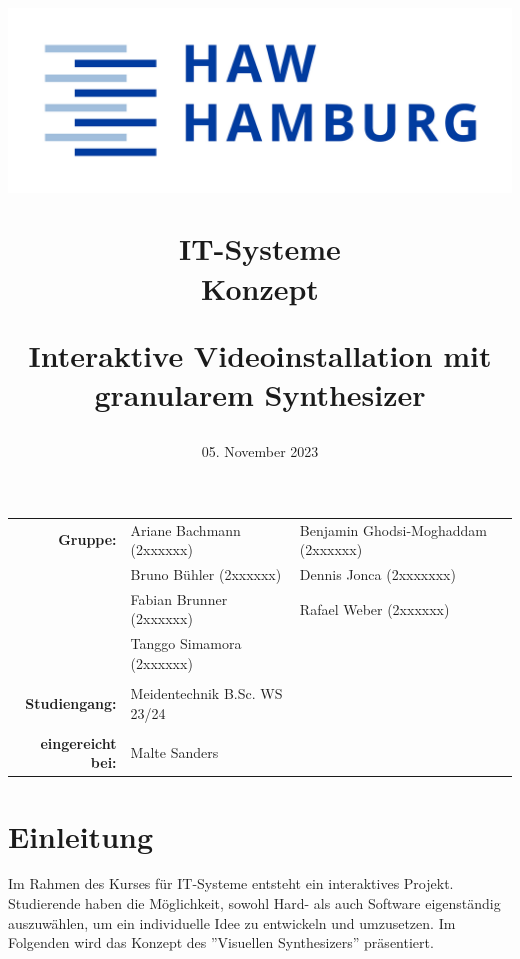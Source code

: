 \documentclass[12pt]{scrartcl}%
\title{
\begin{flushright}
 \includegraphics[scale=0.5]{HAW_Marke_RGB_300dpi.jpg}
\end{flushright}

\vspace{3cm}

IT-Systeme\\
Konzept
 
\vspace{3cm}

\LARGE Interaktive Videoinstallation mit\\
granularem Synthesizer
}
\date{05.  November 2023}
\theoremstyle{nonumberplain}
\begin{document}
\begin{titlepage}


\maketitle %


\vfill 

\begin{flushleft}
\begin{tabular}{rlll}
\textbf{Gruppe:} & Ariane Bachmann (2xxxxxx) & Benjamin Ghodsi-Moghaddam (2xxxxxx) & \hspace{5cm} \\
 & Bruno Bühler (2xxxxxx) & Dennis Jonca (2xxxxxxx) & \hspace{5cm} \\
 & Fabian Brunner (2xxxxxx) & Rafael Weber (2xxxxxx) & \hspace{5cm} \\
& Tanggo Simamora (2xxxxxx) & & \hspace{5cm} \\\\
\textbf{Studiengang:} & Meidentechnik B.Sc. WS 23/24 & \hspace{5cm} \\\\
\textbf{eingereicht bei:} & Malte Sanders & \hspace{5cm} \\ 
\end{tabular}
\end{flushleft}



\end{titlepage}

\tableofcontents


\newpage

\section{Einleitung}

Im Rahmen des Kurses für IT-Systeme entsteht ein interaktives Projekt. Studierende haben die Möglichkeit, sowohl Hard- als auch Software eigenständig auszuwählen, um ein individuelle Idee zu entwickeln und umzusetzen. Im Folgenden wird das Konzept des ''Visuellen Synthesizers'' präsentiert.
\end{document}
